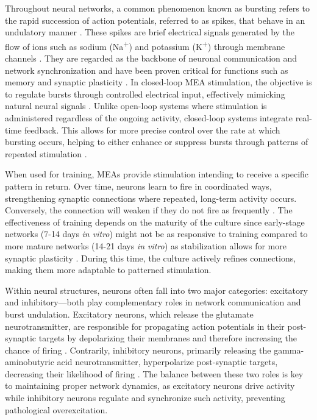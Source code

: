 \documentclass{article} %
\begin{document}
Throughout neural networks, a common phenomenon known as bursting refers to the rapid succession of action potentials, referred to as spikes, that behave in an undulatory manner \parencite{Zeldenrust2018-gz}. These spikes are brief electrical signals generated by the flow of ions such as sodium (Na\textsuperscript{+}) and potassium (K\textsuperscript{+}) through membrane channels \parencite{Stasenko2023-bf}. They are regarded as the backbone of neuronal communication and network synchronization and have been proven critical for functions such as memory and synaptic plasticity \parencite{Guo2015-oo}. In closed-loop MEA stimulation, the objective is to regulate bursts through controlled electrical input, effectively mimicking natural neural signals \parencite{Wu2012-bh}. Unlike open-loop systems where stimulation is administered regardless of the ongoing activity, closed-loop systems integrate real-time feedback. This allows for more precise control over the rate at which bursting occurs, helping to either enhance or suppress bursts through patterns of repeated stimulation \parencite{Berenyi2012-ci}.

When used for training, MEAs provide stimulation intending to receive a specific pattern in return. Over time, neurons learn to fire in coordinated ways, strengthening synaptic connections where repeated, long-term activity occurs. Conversely, the connection will weaken if they do not fire as frequently \parencite{Wagenaar2006-nz}. The effectiveness of training depends on the maturity of the culture since early-stage networks (7-14 days \textit{in vitro}) might not be as responsive to training compared to more mature networks (14-21 days \textit{in vitro}) as stabilization allows for more synaptic plasticity \parencite{Pimashkin2011-rc}. During this time, the culture actively refines connections, making them more adaptable to patterned stimulation.

Within neural structures, neurons often fall into two major categories: excitatory and inhibitory—both play complementary roles in network communication and burst undulation. Excitatory neurons, which release the glutamate neurotransmitter, are responsible for propagating action potentials in their post-synaptic targets by depolarizing their membranes and therefore increasing the chance of firing \parencite{Douglas2004-hr}. Contrarily, inhibitory neurons, primarily releasing the gamma-aminobutyric acid neurotransmitter, hyperpolarize post-synaptic targets, decreasing their likelihood of firing \parencite{Markram2004-ud}. The balance between these two roles is key to maintaining proper network dynamics, as excitatory neurons drive activity while inhibitory neurons regulate and synchronize such activity, preventing pathological overexcitation.
\end{document}
